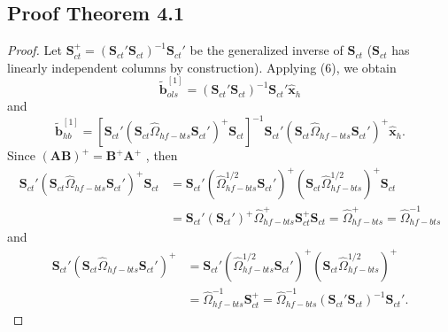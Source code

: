 \documentclass[a4paper,11pt]{article}
\newcommand{\bvet}{\bm{b}}
\newcommand{\xvet}{\bm{x}}
\newcommand{\Avet}{\bm{A}}
\newcommand{\Bvet}{\bm{B}}
\newcommand{\Ivet}{\bm{I}}
\newcommand{\Svet}{\bm{S}}
\newcommand{\Omegavet}{\bm{\Omega}}
\theoremstyle{definition}
\newtheorem{theorem}{Theorem}[section]
\begin{document}
\subsection{Proof Theorem 4.1}
\begin{proof}
Let $\Svet_{ct}^+ = (\Svet_{ct}'\Svet_{ct})^{-1}\Svet_{ct}'$ be the generalized inverse of $\Svet_{ct}$ ($\Svet_{ct}$ has linearly independent columns by construction). Applying (6), we obtain
$$
\widetilde{\bvet}_{ols}^{[1]} = (\Svet_{ct}'\Svet_{ct})^{-1}\Svet_{ct}' \widehat{\xvet}_{h}
$$
and
$$
\widetilde{\bvet}_{hb}^{[1]} = [\Svet_{ct}'(\Svet_{ct}\widehat{\Omega}_{hf-bts}\Svet_{ct}')^{+}\Svet_{ct}]^{-1}\Svet_{ct}' (\Svet_{ct}\widehat{\Omega}_{hf-bts}\Svet_{ct}')^{+}\widehat{\xvet}_{h} .
$$
Since $(\Avet\Bvet)^+ = \Bvet^+\Avet^+$ \citep{greville1966}, then
\begin{equation}\label{eq:part1}\tag{B.1}
\begin{aligned}
	\Svet_{ct}'(\Svet_{ct}\widehat{\Omega}_{hf-bts}\Svet_{ct}')^{+}\Svet_{ct} &= \Svet_{ct}'(\widehat{\Omega}_{hf-bts}^{1/2}\Svet_{ct}')^{+}(\Svet_{ct}\widehat{\Omega}_{hf-bts}^{1/2})^{+}\Svet_{ct} \\
	&= \Svet_{ct}'(\Svet_{ct}')^{+}\widehat{\Omega}_{hf-bts}^{+}\Svet_{ct}^{+}\Svet_{ct} = \widehat{\Omega}_{hf-bts}^{+} = \widehat{\Omega}_{hf-bts}^{-1}
\end{aligned}
\end{equation}
and
\begin{equation}\label{eq:part2}\tag{B.2}
\begin{aligned}
	\Svet_{ct}' (\Svet_{ct}\widehat{\Omega}_{hf-bts}\Svet_{ct}')^{+} &= \Svet_{ct}'(\widehat{\Omega}_{hf-bts}^{1/2}\Svet_{ct}')^{+}(\Svet_{ct}\widehat{\Omega}_{hf-bts}^{1/2})^{+} \\& = \widehat{\Omega}_{hf-bts}^{-1}\Svet_{ct}^+ = \widehat{\Omega}_{hf-bts}^{-1}(\Svet_{ct}'\Svet_{ct})^{-1}\Svet_{ct}'.
\end{aligned}

\end{equation}
\end{proof}
\end{document}
